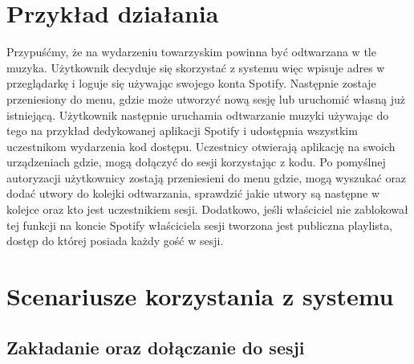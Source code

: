 \section{Przykład działania}
Przypuśćmy, że na wydarzeniu towarzyskim powinna być odtwarzana w tle muzyka. Użytkownik decyduje się skorzystać z systemu więc wpisuje adres w przeglądarkę i loguje się używając swojego konta Spotify. Następnie zostaje przeniesiony do menu, gdzie może utworzyć nową sesję lub uruchomić własną już istniejącą. Użytkownik następnie uruchamia odtwarzanie muzyki używając do tego na przykład dedykowanej aplikacji Spotify i udostępnia wszystkim uczestnikom wydarzenia kod dostępu. Uczestnicy otwierają aplikację na swoich urządzeniach gdzie, mogą dołączyć do sesji korzystając z kodu. Po pomyślnej autoryzacji użytkownicy zostają przeniesieni do menu gdzie, mogą wyszukać oraz dodać utwory do kolejki odtwarzania, sprawdzić jakie utwory są następne w kolejce oraz kto jest uczestnikiem sesji. Dodatkowo, jeśli właściciel nie zablokował tej funkcji na koncie Spotify właściciela sesji tworzona jest publiczna playlista, dostęp do której posiada każdy gość w sesji.

\section{Scenariusze korzystania z systemu}
\subsection{Zakładanie oraz dołączanie do sesji}

